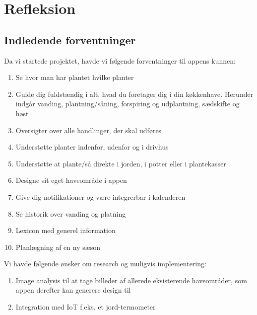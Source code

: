 \section{Refleksion}

\subsection{Indledende forventninger}
Da vi startede projektet, havde vi følgende forventninger til appens kunnen:

\begin{enumerate}
    \item Se hvor man har plantet hvilke planter
    \item Guide dig fuldstændig i alt, hvad du foretager dig i din køkkenhave. Herunder indgår vanding, plantning/såning, forspiring og udplantning, sædskifte og høst
    \item Oversigter over alle handlinger, der skal udføres
    \item Understøtte planter indenfor, udenfor og i drivhus
    \item Understøtte at plante/så direkte i jorden, i potter eller i plantekasser
    \item Designe sit eget haveområde i appen
    \item Give dig notifikationer og være integrerbar i kalenderen
    \item Se historik over vanding og platning
    \item Lexicon med generel information
    \item Planlægning af en ny sæson
\end{enumerate}

\noindent Vi havde følgende ønsker om research og muligvis implementering:

\begin{enumerate}
    \item Image analysis til at tage billeder af allerede eksisterende haveområder, som appen derefter kan generere design til
    \item Integration med IoT f.eks. et jord-termometer
\end{enumerate}


